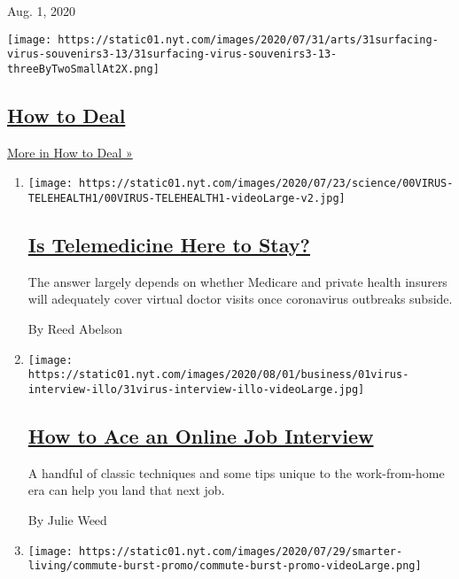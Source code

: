 Aug. 1, 2020

\texttt{[image: https://static01.nyt.com/images/2020/07/31/arts/31surfacing-virus-souvenirs3-13/31surfacing-virus-souvenirs3-13-threeByTwoSmallAt2X.png]}

\hypertarget{how-to-deal}{%
\subsection{\texorpdfstring{\href{/spotlight/how-to-deal}{How to
Deal}}{How to Deal}}\label{how-to-deal}}

\href{/spotlight/how-to-deal}{More in How to Deal »}

\begin{enumerate}
\def\labelenumi{\arabic{enumi}.}
\item
  \texttt{[image: https://static01.nyt.com/images/2020/07/23/science/00VIRUS-TELEHEALTH1/00VIRUS-TELEHEALTH1-videoLarge-v2.jpg]}

  \hypertarget{is-telemedicine-here-to-stay}{%
  \subsection{\texorpdfstring{\href{/2020/08/03/health/covid-telemedicine-congress.html}{Is
  Telemedicine Here to
  Stay?}}{Is Telemedicine Here to Stay?}}\label{is-telemedicine-here-to-stay}}

  The answer largely depends on whether Medicare and private health
  insurers will adequately cover virtual doctor visits once coronavirus
  outbreaks subside.

  By Reed Abelson
\item
  \texttt{[image: https://static01.nyt.com/images/2020/08/01/business/01virus-interview-illo/31virus-interview-illo-videoLarge.jpg]}

  \hypertarget{how-to-ace-an-online-job-interview}{%
  \subsection{\texorpdfstring{\href{/2020/08/03/business/online-job-interview-tips.html}{How
  to Ace an Online Job
  Interview}}{How to Ace an Online Job Interview}}\label{how-to-ace-an-online-job-interview}}

  A handful of classic techniques and some tips unique to the
  work-from-home era can help you land that next job.

  By Julie Weed
\item
  \texttt{[image: https://static01.nyt.com/images/2020/07/29/smarter-living/commute-burst-promo/commute-burst-promo-videoLarge.png]}


\end{enumerate}
